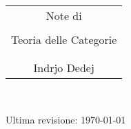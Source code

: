 

\thispagestyle{empty}


\null{}

\begin{center}
\begin{tabular}{c}
{\large Note di} \\
\\
{\Large\sc Teoria delle Categorie} \\
\\
\midrule
\\
{\large Indrjo Dedej}
\end{tabular}
\end{center}

\null

~\vfill
\begin{center}
Ultima revisione: \today
\end{center}

\restoregeometry

\newpage
